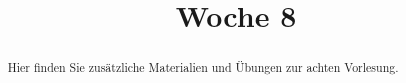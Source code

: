 \documentclass{ximera}
\title{Woche 8}
\begin{document}
\begin{abstract}
Hier finden Sie zusätzliche Materialien und Übungen zur achten Vorlesung.
\end{abstract}
\maketitle
\end{document}

